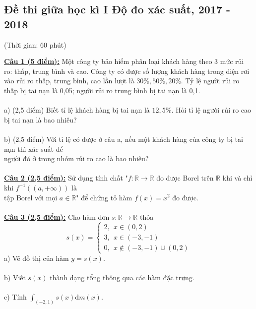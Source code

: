 \documentclass[10pt, a4paper]{article}
\begin{document}
\subsection{Đề thi giữa học kì I Độ đo xác suất, 2017 - 2018}
\begin{center}
	\color{blue}(Thời gian: 60 phút)
\end{center}
\color{red}\underline{\textbf{Câu 1 (5 điểm):}} \color{black}Một công ty bảo hiểm phân loại khách hàng theo 3 mức rủi ro: thấp, trung bình và cao. Công ty có được số lượng khách hàng trong diện rơi vào rủi ro thấp, trung bình, cao lần lượt là $30\%,50\%,20\%$. Tỷ lệ người rủi ro thấp bị tai nạn là 0,05; người rủi ro trung bình bị tai nạn là 0,1.\\\\
\color{red}a) (2,5 điểm) \color{black}Biết tỉ lệ khách hàng bị tai nạn là $12,5\%$. Hỏi tỉ lệ người rủi ro cao bị tai nạn là bao nhiêu?\\\\
\color{red}b) (2,5 điểm) \color{black}Với tỉ lệ có được ở câu a, nếu một khách hàng của công ty bị tai nạn thì xác suất để\\ người đó ở trong nhóm rủi ro cao là bao nhiêu?\\\\
\color{red}\underline{\textbf{Câu 2 (2,5 điểm):}} \color{black}Sử dụng tính chất "$f:\mathbb R\rightarrow\mathbb R$ đo được Borel trên $\mathbb R$ khi và chỉ khi $f^{-1}((a,+\infty))$ là\\ tập Borel với mọi $a\in\mathbb R$" để chứng tỏ hàm $f(x)=x^2$ đo được.\\\\
\color{red}\underline{\textbf{Câu 3 (2,5 điểm):}} \color{black}Cho hàm đơn $s:\mathbb R\rightarrow\mathbb R$ thỏa $$s(x)=\begin{cases}
	2,~~x\in(0,2)\\
	3,~~x\in(-3,-1)\\
	0,~~x\notin(-3,-1)\cup(0,2)
\end{cases}$$
\color{red}a) \color{black}Vẽ đồ thị của hàm $y=s(x)$.\\\\
\color{red}b) \color{black}Viết $s(x)$ thành dạng tổng thông qua các hàm đặc trưng.\\\\
\color{red}c) \color{black}Tính $\displaystyle\int_{(-2,1)}s(x)\text{d}m(x)$.\\\\

\newpage
\end{document}
